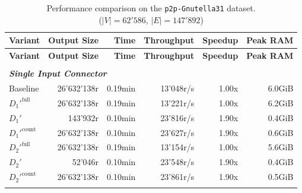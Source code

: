 \begin{longtable}{lrrrrr}
    
    \caption[p2p-Gnutella31 Performance Comparison]{Performance comparison on the \texttt{p2p-Gnutella31} dataset. \\ ($|V| = 62'586$, $|E| = 147'892$)}
    \label{tab:results_p2p-Gnutella31} \\

    \toprule
    \textbf{Variant}      & \textbf{Output Size}  & \textbf{Time}       & \textbf{Throughput}   & \textbf{Speedup}  & \textbf{Peak RAM} \\
    \midrule
    \endfirsthead 

    \toprule
    \textbf{Variant}      & \textbf{Output Size}  & \textbf{Time}       & \textbf{Throughput}   & \textbf{Speedup}  & \textbf{Peak RAM} \\
    \midrule
    \endhead 

    \bottomrule
    \endfoot  

    \endlastfoot 

    
    \multicolumn{6}{l}{\textit{5 Path Query}} \\
    \midrule
    \multicolumn{6}{l}{\textit{\textbf{Single Input Connector}}} \\
    \nopagebreak
    Baseline              &  26'632'138r          &  0.19min        &  13'048r/s           & 1.00x             & 6.0GiB    \\
    $D_1'^{\text{full}}$   &  26'632'138r          &  0.19min        &  13'221r/s           & 1.00x             & 6.2GiB    \\
    \quad $D_1'$           &  143'932r             &  0.10min        &  23'816r/s           & 1.90x             & 0.4GiB    \\
    $D_1'^{\text{count}}$  &  26'632'138r          &  0.10min        &  23'627r/s           & 1.90x             & 0.6GiB    \\
    $D_2'^{\text{full}}$   &  26'632'138r          &  0.19min        &  13'154r/s           & 1.00x             & 5.6GiB    \\
    \quad $D_2'$           &  52'046r              &  0.10min        &  23'548r/s           & 1.90x             & 0.4GiB    \\
    $D_2'^{\text{count}}$  &  26'632'138r          &  0.10min        &  23'861r/s           & 1.90x             & 0.5GiB    \\
    \addlinespace
    

\end{longtable}
